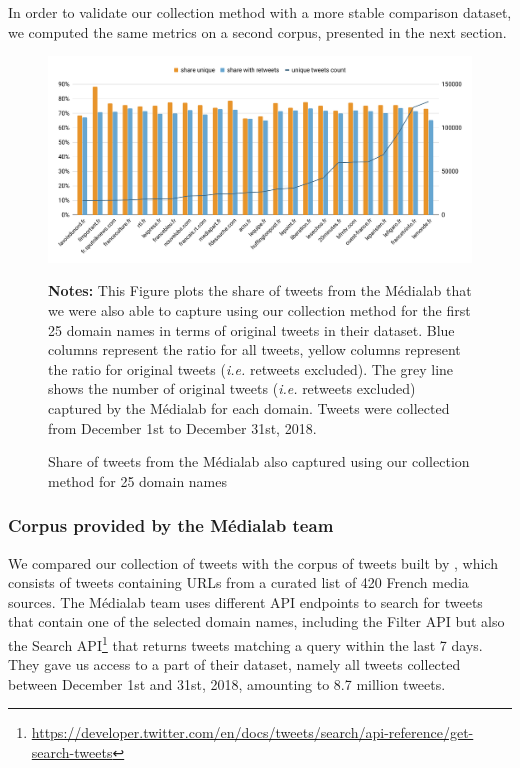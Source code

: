 In order to validate our collection method with a more stable comparison dataset, we computed the same metrics on a second corpus, presented in the next section.
\begin{figure}
\begin{center}
\includegraphics[width=1\textwidth]{figures/ShareInCommonWithMedialab.pdf}
\end{center}
\scriptsize \textbf{Notes:} This Figure plots the share of tweets from the Médialab that we were also able to capture using our collection method for the first 25 domain names in terms of original tweets in their dataset. Blue columns represent the ratio for all tweets, yellow columns represent the ratio for original tweets (\textit{i.e.} retweets excluded). The grey line shows the number of original tweets (\textit{i.e.} retweets excluded) captured by the Médialab for each domain. Tweets were collected from December 1st to December 31st, 2018.

\caption{Share of tweets from the Médialab also captured using our collection method for 25 domain names}
\label{Figure:HistogramUrlsMedialab}
\end{figure}
\subsubsection{Corpus provided by the Médialab team}

We compared our collection of tweets with the corpus of tweets built by \citet{cardon2019unfolding}, which consists of
tweets containing URLs from a curated list of 420 French media sources. The Médialab team uses different API endpoints to search for tweets that contain one of the selected domain names, including the Filter API but also the Search API\footnote{\url{https://developer.twitter.com/en/docs/tweets/search/api-reference/get-search-tweets}} that returns tweets matching a query within the last 7 days. They gave us access to a part of their dataset, namely all tweets collected between December 1st and 31st, 2018, amounting to 8.7 million tweets. 

